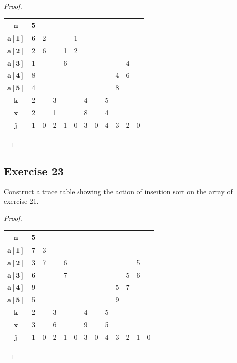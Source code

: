 \documentclass[14pt]{extarticle}
\begin{document}
\begin{proof}
\begin{center}
\begin{tabular}{|c|c|c|c|c|c|c|c|c|c|c|c|}
\hline
\(\bm{n}\) &5&&&&&&&&&& \\
\hline
\(\bm{a[1]}\) &6&2&&&1&&&&&& \\
\hline
\(\bm{a[2]}\) &2&6&&1&2&&&&&& \\
\hline
\(\bm{a[3]}\) &1&&&6&&&&&&4& \\
\hline
\(\bm{a[4]}\) &8&&&&&&&&4&6& \\
\hline
\(\bm{a[5]}\) &4&&&&&&&&8&& \\
\hline
\(\bm{k}\) &2&&3&&&4&&5&&& \\
\hline
\(\bm{x}\) &2&&1&&&8&&4&&& \\
\hline
\(\bm{j}\) &1&0&2&1&0&3&0&4&3&2&0 \\
\hline
\end{tabular}
\end{center}
\end{proof}

\subsection{Exercise 23}
Construct a trace table showing the action of insertion sort on the array of exercise 21.

\begin{proof}
\begin{center}
\begin{tabular}{|c|c|c|c|c|c|c|c|c|c|c|c|c|}
\hline
\(\bm{n}\) &5&&&&&&&&&&& \\
\hline
\(\bm{a[1]}\) &7&3&&&&&&&&&& \\
\hline
\(\bm{a[2]}\) &3&7&&6&&&&&&&5& \\
\hline
\(\bm{a[3]}\) &6&&&7&&&&&&5&6& \\
\hline
\(\bm{a[4]}\) &9&&&&&&&&5&7&& \\
\hline
\(\bm{a[5]}\) &5&&&&&&&&9&&& \\
\hline
\(\bm{k}\) &2&&3&&&4&&5&&&& \\
\hline
\(\bm{x}\) &3&&6&&&9&&5&&&& \\
\hline
\(\bm{j}\) &1&0&2&1&0&3&0&4&3&2&1&0 \\
\hline
\end{tabular}
\end{center}
\end{proof}
\end{document}
